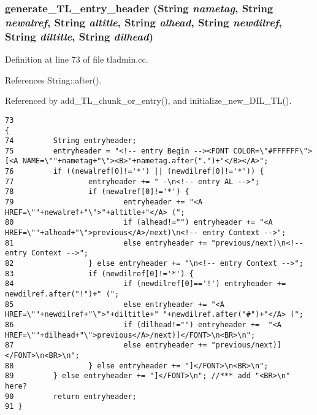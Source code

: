 \subsubsection{ generate\_\-TL\_\-entry\_\-header ({\bf String} {\em nametag}, {\bf String} {\em newalref}, {\bf String} {\em altitle}, {\bf String} {\em alhead}, {\bf String} {\em newdilref}, {\bf String} {\em diltitle}, {\bf String} {\em dilhead})}\label{tladmin_8cc_a3}




Definition at line 73 of file tladmin.cc.

References String::after().

Referenced by add\_\-TL\_\-chunk\_\-or\_\-entry(), and initialize\_\-new\_\-DIL\_\-TL().



\footnotesize\begin{verbatim}73                                                                                                                                                    {
74         String entryheader;
75         entryheader = "<!-- entry Begin --><FONT COLOR=\"#FFFFFF\">[<A NAME=\""+nametag+"\"><B>"+nametag.after(".")+"</B></A>";
76         if ((newalref[0]!='*') || (newdilref[0]!='*')) {
77                 entryheader += " -\n<!-- entry AL -->";
78                 if (newalref[0]!='*') {
79                         entryheader += "<A HREF=\""+newalref+"\">"+altitle+"</A> (";
80                         if (alhead!="") entryheader += "<A HREF=\""+alhead+"\">previous</A>/next)\n<!-- entry Context -->";
81                         else entryheader += "previous/next)\n<!-- entry Context -->";
82                 } else entryheader += "\n<!-- entry Context -->";
83                 if (newdilref[0]!='*') {
84                         if (newdilref[0]=='!') entryheader += newdilref.after("!")+" (";
85                         else entryheader += "<A HREF=\""+newdilref+"\">"+diltitle+" "+newdilref.after("#")+"</A> (";
86                         if (dilhead!="") entryheader +=  "<A HREF=\""+dilhead+"\">previous</A>/next)]</FONT>\n<BR>\n";
87                         else entryheader += "previous/next)]</FONT>\n<BR>\n";
88                 } else entryheader += "]</FONT>\n<BR>\n";
89         } else entryheader += "]</FONT>\n"; //*** add "<BR>\n" here?
90         return entryheader;
91 }
\end{verbatim}\normalsize 
{}
